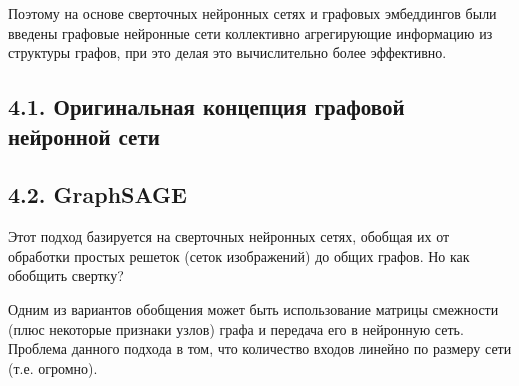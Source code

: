 Поэтому на основе сверточных нейронных сетях и графовых эмбеддингов были введены графовые нейронные сети коллективно агрегирующие информацию из структуры графов, при это делая это вычислительно более эффективно.

\subsection{4.1. Оригинальная концепция графовой нейронной сети}


\subsection{4.2. GraphSAGE}

Этот подход базируется на сверточных нейронных сетях, обобщая их от обработки простых решеток (сеток изображений) до общих графов. Но как обобщить свертку?

Одним из вариантов обобщения может быть использование матрицы смежности (плюс некоторые признаки узлов) графа и передача его в нейронную сеть. Проблема данного подхода в том, что количество входов линейно по размеру сети (т.е. огромно).

\clearpage